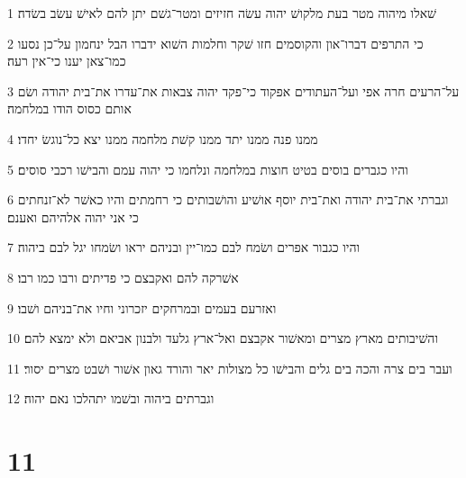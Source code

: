 \par 1 שׁאלו מיהוה מטר בעת מלקושׁ יהוה עשׂה חזיזים ומטר־גשׁם יתן להם לאישׁ עשׂב בשׂדה׃
\par 2 כי התרפים דברו־און והקוסמים חזו שׁקר וחלמות השׁוא ידברו הבל ינחמון על־כן נסעו כמו־צאן יענו כי־אין רעה׃
\par 3 על־הרעים חרה אפי ועל־העתודים אפקוד כי־פקד יהוה צבאות את־עדרו את־בית יהודה ושׂם אותם כסוס הודו במלחמה׃
\par 4 ממנו פנה ממנו יתד ממנו קשׁת מלחמה ממנו יצא כל־נוגשׂ יחדו׃
\par 5 והיו כגברים בוסים בטיט חוצות במלחמה ונלחמו כי יהוה עמם והבישׁו רכבי סוסים׃
\par 6 וגברתי את־בית יהודה ואת־בית יוסף אושׁיע והושׁבותים כי רחמתים והיו כאשׁר לא־זנחתים כי אני יהוה אלהיהם ואענם׃
\par 7 והיו כגבור אפרים ושׂמח לבם כמו־יין ובניהם יראו ושׂמחו יגל לבם ביהוה׃
\par 8 אשׁרקה להם ואקבצם כי פדיתים ורבו כמו רבו׃
\par 9 ואזרעם בעמים ובמרחקים יזכרוני וחיו את־בניהם ושׁבו׃
\par 10 והשׁיבותים מארץ מצרים ומאשׁור אקבצם ואל־ארץ גלעד ולבנון אביאם ולא ימצא להם׃
\par 11 ועבר בים צרה והכה בים גלים והבישׁו כל מצולות יאר והורד גאון אשׁור ושׁבט מצרים יסור׃
\par 12 וגברתים ביהוה ובשׁמו יתהלכו נאם יהוה׃

\chapter{11}

